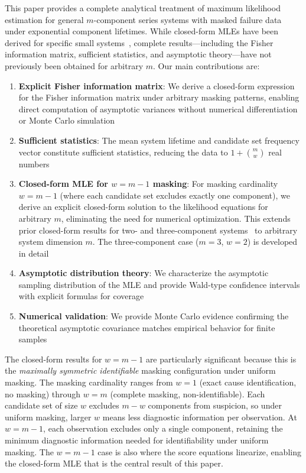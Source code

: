 \documentclass[12pt]{article}
\theoremstyle{definition}
\theoremstyle{remark}
\begin{document}
This paper provides a complete analytical treatment of maximum likelihood estimation for general $m$-component series systems with masked failure data under exponential component lifetimes. While closed-form MLEs have been derived for specific small systems~\cite{miyakawa1984,exactmle}, complete results---including the Fisher information matrix, sufficient statistics, and asymptotic theory---have not previously been obtained for arbitrary $m$. Our main contributions are:
\begin{enumerate}
    \item \textbf{Explicit Fisher information matrix}: We derive a closed-form expression for the Fisher information matrix under arbitrary masking patterns, enabling direct computation of asymptotic variances without numerical differentiation or Monte Carlo simulation

    \item \textbf{Sufficient statistics}: The mean system lifetime and candidate set frequency vector constitute sufficient statistics, reducing the data to $1 + \binom{m}{w}$ real numbers

    \item \textbf{Closed-form MLE for $w=m-1$ masking}: For masking cardinality $w = m-1$ (where each candidate set excludes exactly one component), we derive an explicit closed-form solution to the likelihood equations for arbitrary $m$, eliminating the need for numerical optimization. This extends prior closed-form results for two- and three-component systems~\cite{miyakawa1984,exactmle} to arbitrary system dimension $m$. The three-component case ($m=3$, $w=2$) is developed in detail

    \item \textbf{Asymptotic distribution theory}: We characterize the asymptotic sampling distribution of the MLE and provide Wald-type confidence intervals with explicit formulas for coverage

    \item \textbf{Numerical validation}: We provide Monte Carlo evidence confirming the theoretical asymptotic covariance matches empirical behavior for finite samples
\end{enumerate}

The closed-form results for $w=m-1$ are particularly significant because this is the \emph{maximally symmetric identifiable} masking configuration under uniform masking. The masking cardinality ranges from $w=1$ (exact cause identification, no masking) through $w=m$ (complete masking, non-identifiable). Each candidate set of size $w$ excludes $m-w$ components from suspicion, so under uniform masking, larger $w$ means less diagnostic information per observation. At $w=m-1$, each observation excludes only a single component, retaining the minimum diagnostic information needed for identifiability under uniform masking. The $w=m-1$ case is also where the score equations linearize, enabling the closed-form MLE that is the central result of this paper.
\end{document}

